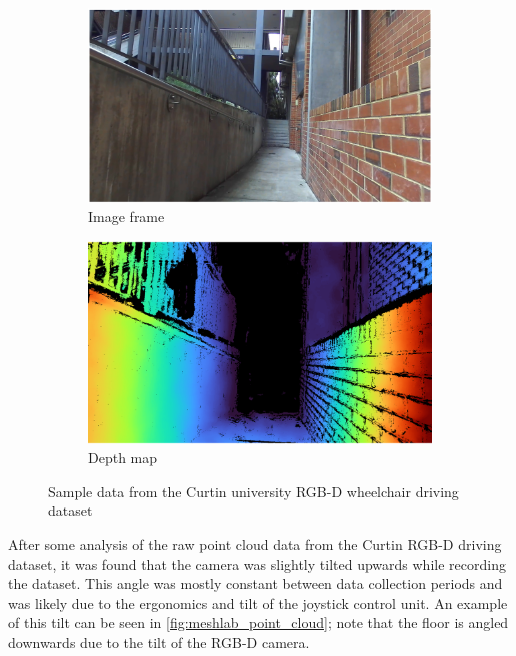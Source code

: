 \begin{figure}[H]
    \centering
    \begin{subfigure}{.48\textwidth}
        \centering
        \includegraphics[width=\linewidth]{images/zed_sample_image.png}
        \caption{Image frame}
    \end{subfigure}
    \quad
    \begin{subfigure}{.47\textwidth}
        \centering
        \includegraphics[width=\linewidth]{images/zed_sample_depth.png}
        \caption{Depth map}
    \end{subfigure}
    \caption{Sample data from the Curtin university RGB-D wheelchair driving dataset}
    \label{fig:zed_sample_dataset}
\end{figure}
\pagebreak

After some analysis of the raw point cloud data from the Curtin RGB-D driving dataset,
it was found that the camera was slightly tilted upwards while recording the dataset.
This angle was mostly constant between data collection periods
and was likely due to the ergonomics and tilt of the joystick control unit.
An example of this tilt can be seen in \cref{fig:meshlab_point_cloud}; note
that the floor is angled downwards due to the tilt of the RGB-D camera.

